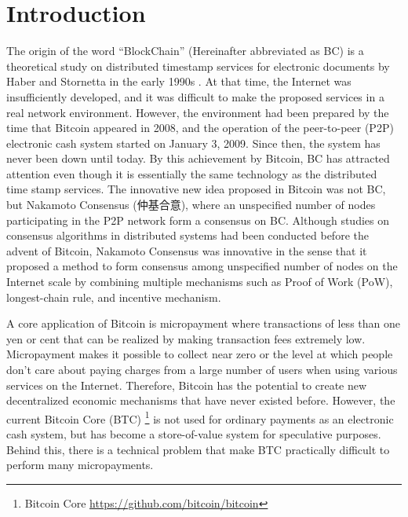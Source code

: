 \documentclass[graybox]{svmult}
\begin{document}
\section{Introduction}
\label{sec:intro}
The origin of the word ``BlockChain'' (Hereinafter abbreviated as BC) is a theoretical study on distributed timestamp services for electronic documents by Haber and Stornetta in the early 1990s
\cite{HS1991,BHS1993,HS1997}.
At that time, the Internet was insufficiently developed, and it was difficult to make the proposed services in a real network environment.
However, the environment had been prepared by the time that Bitcoin \cite{nakamoto} appeared in 2008, and the operation of the peer-to-peer (P2P) electronic cash system started on January 3, 2009.
Since then, the system has never been down until today. 
By this achievement by Bitcoin, BC has attracted attention even though it is essentially the same technology as the distributed time stamp services.
The innovative new idea proposed in Bitcoin was not BC, but Nakamoto Consensus (仲基合意), where an unspecified number of nodes participating in the P2P network form a consensus on BC. 
Although studies on consensus algorithms in distributed systems had been conducted before the advent of Bitcoin, Nakamoto Consensus was innovative in the sense that it proposed a method to form consensus among unspecified number of nodes on the Internet scale by combining multiple mechanisms such as Proof of Work (PoW)\cite{DN1993,JJ1999}, longest-chain rule, and incentive mechanism.


A core application of Bitcoin is micropayment where transactions of less than one yen or cent that can be realized by making transaction fees extremely low. 
Micropayment makes it possible to collect near zero or the level at which people don't care about paying charges from a large number of users when using various services on the Internet. 
Therefore, Bitcoin has the potential to create new decentralized economic mechanisms that have never existed before.
However, the current Bitcoin Core (BTC) \footnote{Bitcoin Core \url{https://github.com/bitcoin/bitcoin}} is not used for ordinary payments as an electronic cash system, but has become a store-of-value system for speculative purposes. 
Behind this, there is a technical problem that make BTC practically difficult to perform many micropayments. 
\end{document}
